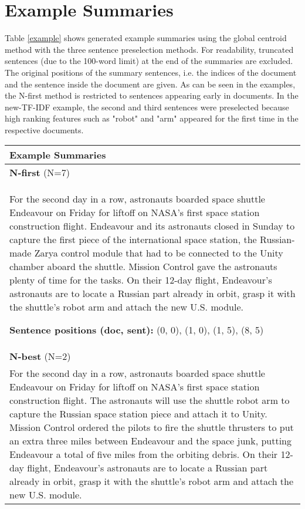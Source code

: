 \documentclass[11pt,letterpaper]{article}
\begin{document}
\section{Example Summaries}
Table \ref{example} shows generated example summaries using the global centroid method with the three sentence preselection methods. For readability, truncated sentences (due to the 100-word limit) at the end of the summaries are excluded. The original positions of the summary sentences, i.e. the indices of the document and the sentence inside the document are given. As can be seen in the examples, the N-first method is restricted to sentences appearing early in documents. In the new-TF-IDF example, the second and third sentences were preselected because high ranking features such as "robot" and "arm" appeared for the first time in the respective documents. 
\begin{table*}[t]
	\centering
	\begin{tabular}{|p{15.5cm}|}
		\hline
		\textbf{Example Summaries}	
		\\ \hline
		\textbf{N-first} (N=7)\\
		\small
		For the second day in a row, astronauts boarded space shuttle Endeavour on Friday for liftoff on NASA's first space station construction flight. Endeavour and its astronauts closed in Sunday to capture the first piece of the international space station, the Russian-made Zarya control module that had to be connected to the Unity chamber aboard the shuttle. Mission Control gave the astronauts plenty of time for the tasks. On their 12-day flight, Endeavour's astronauts are to locate a Russian part already in orbit, grasp it with the shuttle's robot arm and attach the new U.S. module. 
		
		\textbf{Sentence positions (doc, sent):} (0, 0), (1, 0), (1, 5), (8, 5)
		\\ \hline
		
		\textbf{N-best} (N=2)\\ 
		\small
		For the second day in a row, astronauts boarded space shuttle Endeavour on Friday for liftoff on NASA's first space station construction flight. The astronauts will use the shuttle robot arm to capture the Russian space station piece and attach it to Unity. Mission Control ordered the pilots to fire the shuttle thrusters to put an extra three miles between Endeavour and the space junk, putting Endeavour a total of five miles from the orbiting debris. On their 12-day flight, Endeavour's astronauts are to locate a Russian part already in orbit, grasp it with the shuttle's robot arm and attach the new U.S. module.
		

\end{tabular}
\end{table*}
\end{document}
